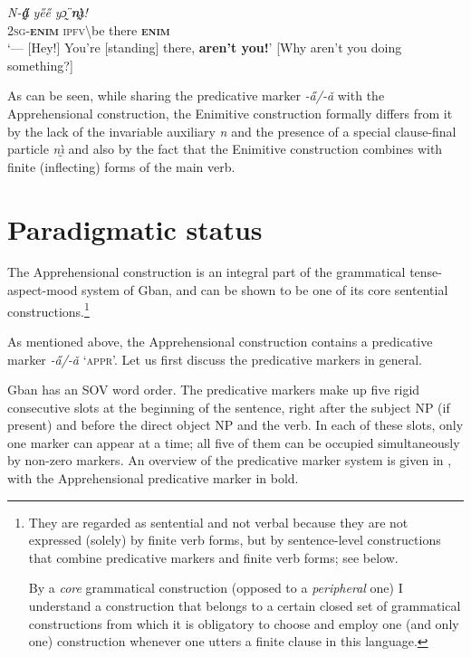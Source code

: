 \documentclass[output=paper,colorlinks,citecolor=brown
]{langscibook}
\begin{document}
\ea \label{ex:Fed5}
\gll \textit{N-\textbf{a̰̋}} \textit{ye̋e̋} \textit{yɔ̰̈} \textit{\textbf{nı̰̀}!} \\
\textsc{2sg-\textbf{enim}} \textsc{ipfv}\backslash be there \textsc{\textbf{enim}} \\
 `--- [Hey!] You're [standing] there, \textbf{aren't you!}' [Why aren't you doing something?]
\z

\noindent As can be seen, while sharing the predicative marker \textit{-a̋/-ǎ} with the Apprehensional construction, the Enimitive construction formally differs from it by the lack of the invariable auxiliary \textit{n{\ù}} and the presence of a special clause-final particle \textit{nı̰̀} and also by the fact that the Enimitive construction combines with finite (inflecting) forms of the main verb.



\section{Paradigmatic status}
\label{sec:fedotov:paradigmaticstatus}

The Apprehensional construction is an integral part of the grammatical tense-aspect-mood system of Gban, and can be shown to be one of its core sentential constructions.\footnote{They
  are regarded as sentential and not verbal because they are not expressed (solely) by finite verb forms, but by sentence-level constructions that combine predicative markers and finite verb forms; see below.

  By a \textit{core} grammatical construction (opposed to a \textit{peripheral} one) I understand a construction that belongs to a certain closed set of grammatical constructions from which it is obligatory to choose and employ one (and only one) construction whenever one utters a finite clause in this language.\label{footnote6}
}

As mentioned above, the Apprehensional construction contains a predicative marker \textit{-a̋/-ǎ} `\textsc{appr}'. Let us first discuss the predicative markers in general.

Gban has an SOV word order. The predicative markers make up five rigid consecutive slots at the beginning of the sentence, right after the subject NP (if present) and before the direct object NP and the verb. In each of these slots, only one marker can appear at a time; all five of them can be occupied simultaneously by non-zero markers. An overview of the predicative marker system is given in , with the Apprehensional predicative marker in bold.
\end{document}
